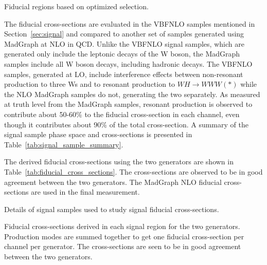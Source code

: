 \begin{table}[ht!]
\centering
\begin{footnotesize}

\end{footnotesize}
\caption{Fiducial regions based on optimized selection.}
\label{tab:fiducial_selection}
\end{table}

The fiducial cross-sections are evaluated in the VBFNLO samples mentioned in Section~\ref{sec:signal} and compared
to another set of samples generated using MadGraph at NLO in QCD. Unlike the VBFNLO signal samples, which are 
generated only include the leptonic decays of the W boson, the MadGraph samples include all W boson decays, including hadronic decays. The VBFNLO samples, generated at LO, include interference effects between non-resonant production to three Ws and to resonant production to $WH\rightarrow WWW(*)$ while the NLO MadGraph samples do not, generating the two separately. As measured at truth level from the MadGraph samples, resonant production is observed to contribute about 50-60\% to
the fiducial cross-section in each channel, even though it contributes about 90\% of the total cross-section.  A summary of the signal sample phase space and cross-sections is
presented in Table~\ref{tab:signal_sample_summary}.

The derived fiducial cross-sections using the two generators are shown in Table~\ref{tab:fiducial_cross_sections}.  The cross-sections are observed
to be in good agreement between the two generators. The MadGraph NLO
fiducial cross-sections are used in the final measurement.



\begin{table}[ht!]
\centering
\begin{footnotesize}

\end{footnotesize}
\caption{Details of signal samples used to study signal fiducial cross-sections.}
\label{tab:signal_sample_summary}
\end{table}





\begin{table}[ht!]
\centering
\begin{footnotesize}

\end{footnotesize}
\caption{Fiducial cross-sections derived in each signal region for the two generators. Production modes are summed together to get one fiducial cross-section per channel per generator. The cross-sections are seen to be in good agreement
between the two generators.}
\label{tab:fiducial_cross_sections}
\end{table}
